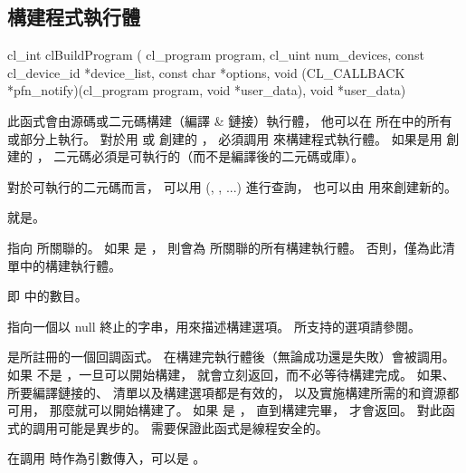\subsection{構建程式執行體}


\startCLFUNC
cl_int clBuildProgram (
		cl_program program,
		cl_uint num_devices,
		const cl_device_id *device_list,
		const char *options,
		void (CL_CALLBACK *pfn_notify)(cl_program program,
					void *user_data),
		void *user_data)
\stopCLFUNC

此函式會由源碼或二元碼構建（編譯 & 鏈接）執行體，
他可以在  所在中的所有或部分上執行。
對於用  或 
創建的 ，
必須調用  來構建程式執行體。
如果是用  創建的 ，
二元碼必須是可執行的（而不是編譯後的二元碼或庫）。

對於可執行的二元碼而言，
可以用 (, , ...) 進行查詢，
也可以由  用來創建新的。

 就是。

 指向  所關聯的。
如果  是 ，
則會為  所關聯的所有構建執行體。
否則，僅為此清單中的構建執行體。

 即  中的數目。

 指向一個以 null 終止的字串，用來描述構建選項。
所支持的選項請參閱。

 是所註冊的一個回調函式。
在構建完執行體後（無論成功還是失敗）會被調用。
如果  不是 ，一旦可以開始構建，
 就會立刻返回，而不必等待構建完成。
如果、所要編譯鏈接的、
清單以及構建選項都是有效的，
以及實施構建所需的和資源都可用，
那麼就可以開始構建了。
如果  是 ，
直到構建完畢，  才會返回。
對此函式的調用可能是異步的。
需要保證此函式是線程安全的。

 在調用  時作為引數傳入，可以是 。

